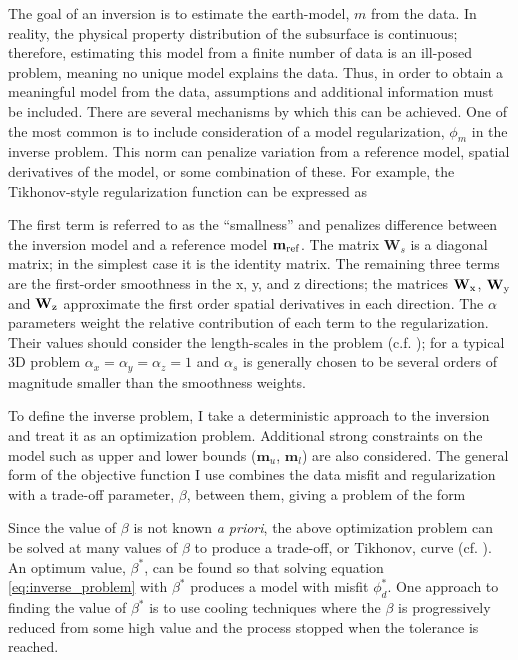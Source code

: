 The goal of an inversion is to estimate the earth-model, $m$ from the data. In reality, the physical property distribution of the subsurface is continuous; therefore, estimating this model from a finite number of data is an ill-posed problem, meaning no unique model explains the data. Thus, in order to obtain a meaningful model from the data, assumptions and additional information must be included. There are several mechanisms by which this can be achieved. One of the most common is to include consideration of a model regularization, $\phi_m$ in the inverse problem. This norm can penalize variation from a reference model, spatial derivatives of the model, or some combination of these. For example, the Tikhonov-style regularization function can be expressed as

The first term is referred to as the ``smallness'' and penalizes difference between the inversion model and a reference model $\mathbf{m_{\rm ref}}$. The matrix $\mathbf{W}_s$ is a diagonal matrix; in the simplest case it is the identity matrix. The remaining three terms are the first-order smoothness in the x, y, and z directions; the matrices $\mathbf{W}_{\rm x}$, $\mathbf{W}_{\rm y}$ and $\mathbf{W}_{\rm z}$ approximate the first order spatial derivatives in each direction. The $\alpha$ parameters weight the relative contribution of each term to the regularization. Their values should consider the length-scales in the problem (c.f. \cite{Oldenburg2005}); for a typical 3D problem $\alpha_x = \alpha_y = \alpha_z = 1$ and $\alpha_s$ is generally chosen to be several orders of magnitude smaller than the smoothness weights.

To define the inverse problem, I take a deterministic approach to the inversion and treat it as an optimization problem. Additional strong constraints on the model such as upper and lower bounds ($\mathbf{m}_u$, $\mathbf{m}_l$) are also considered. The general form of the objective function I use combines the data misfit and regularization with a trade-off parameter, $\beta$, between them, giving a problem of the form

Since the value of $\beta$ is not known \emph{a priori}, the above optimization problem can be solved at many values of $\beta$ to produce a trade-off, or Tikhonov, curve (cf. \cite{Parker1994}). An optimum value, $\beta^*$, can be found so that solving equation \ref{eq:inverse_problem} with $\beta^*$ produces a model with misfit $\phi_d^*$. One approach to finding the value of $\beta^*$ is to use cooling techniques where the $\beta$ is progressively reduced from some high value and the process stopped when the tolerance is reached.

